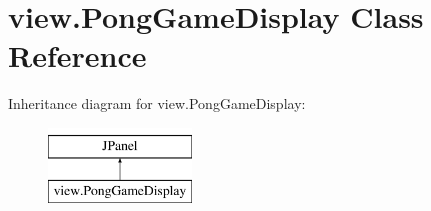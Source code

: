 \hypertarget{classview_1_1_pong_game_display}{}\section{view.\+Pong\+Game\+Display Class Reference}
\label{classview_1_1_pong_game_display}
Inheritance diagram for view.\+Pong\+Game\+Display\+:\begin{figure}[H]
\begin{center}
\leavevmode
\includegraphics[height=2.000000cm]{classview_1_1_pong_game_display}
\end{center}
\end{figure}
